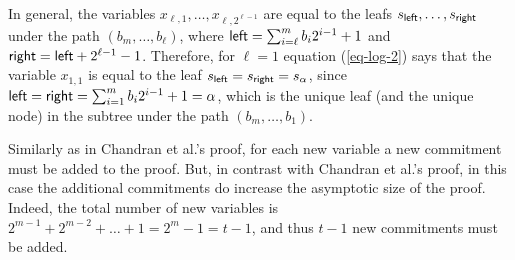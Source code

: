 In general, the variables $x_{\ell,1},\ldots,x_{\ell,2^{\ell-1}}$ are equal to the leafs $s_{{\mathsf{left}}},\ldots,\allowbreak s_{{\mathsf{right}}}$ under the path $(b_m,\ldots, b_\ell)$, where ${\mathsf{left}}=\sum_{i=\ell}^m b_i 2^{i-1}+1$ and ${\mathsf{right}}={\mathsf{left}}+2^{\ell-1}-1$. 
Therefore, for $\ell=1$ equation (\ref{eq-log-2}) says that the variable $x_{1,1}$ is equal to the leaf $s_{{\mathsf{left}}}=s_{{\mathsf{right}}}=s_\alpha$, since ${\mathsf{left}}={\mathsf{right}}=\sum_{i=1}^m b_i2^{i-1}+1=\alpha$, which is the unique leaf (and the unique node) in the subtree under the path $(b_m,\ldots, b_1)$.

Similarly as in Chandran et al.'s proof, for each new variable a new commitment must be added to the proof. But, in contrast with Chandran et al.'s proof, in this case the additional commitments do increase the asymptotic size of the proof. Indeed, the total number of new variables is \(2^{m-1}+2^{m-2}+\ldots+1=2^m-1=t-1\), and thus $t-1$ new commitments must be added.

